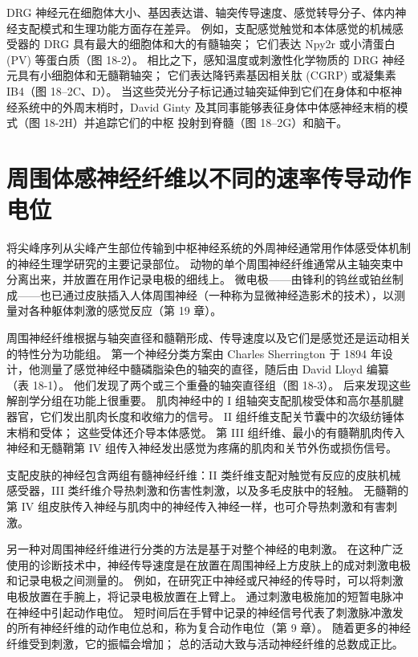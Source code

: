 DRG 神经元在细胞体大小、基因表达谱、轴突传导速度、感觉转导分子、体内神经支配模式和生理功能方面存在差异。 例如，支配感觉触觉和本体感觉的机械感受器的 DRG 具有最大的细胞体和大的有髓轴突； 它们表达 Npy2r 或小清蛋白 (PV) 等蛋白质（图 18-2）。 相比之下，感知温度或刺激性化学物质的 DRG 神经元具有小细胞体和无髓鞘轴突； 它们表达降钙素基因相关肽 (CGRP) 或凝集素 IB4（图 18–2C、D）。 当这些荧光分子标记通过轴突延伸到它们在身体和中枢神经系统中的外周末梢时，David Ginty 及其同事能够表征身体中体感神经末梢的模式（图 18-2H）并追踪它们的中枢 投射到脊髓（图 18–2G）和脑干。

\section{周围体感神经纤维以不同的速率传导动作电位}

将尖峰序列从尖峰产生部位传输到中枢神经系统的外周神经通常用作体感受体机制的神经生理学研究的主要记录部位。 动物的单个周围神经纤维通常从主轴突束中分离出来，并放置在用作记录电极的细线上。 微电极——由锋利的钨丝或铂丝制成——也已通过皮肤插入人体周围神经（一种称为显微神经造影术的技术），以测量对各种躯体刺激的感觉反应（第 19 章）。

周围神经纤维根据与轴突直径和髓鞘形成、传导速度以及它们是感觉还是运动相关的特性分为功能组。 第一个神经分类方案由 Charles Sherrington 于 1894 年设计，他测量了感觉神经中髓磷脂染色的轴突的直径，随后由 David Lloyd 编纂（表 18-1）。 他们发现了两个或三个重叠的轴突直径组（图 18-3）。 后来发现这些解剖学分组在功能上很重要。 肌肉神经中的 I 组轴突支配肌梭受体和高尔基肌腱器官，它们发出肌肉长度和收缩力的信号。 II 组纤维支配关节囊中的次级纺锤体末梢和受体； 这些受体还介导本体感觉。 第 III 组纤维、最小的有髓鞘肌肉传入神经和无髓鞘第 IV 组传入神经发出感觉为疼痛的肌肉和关节外伤或损伤信号。

支配皮肤的神经包含两组有髓神经纤维：II 类纤维支配对触觉有反应的皮肤机械感受器，III 类纤维介导热刺激和伤害性刺激，以及多毛皮肤中的轻触。 无髓鞘的第 IV 组皮肤传入神经与肌肉中的神经传入神经一样，也可介导热刺激和有害刺激。

另一种对周围神经纤维进行分类的方法是基于对整个神经的电刺激。 在这种广泛使用的诊断技术中，神经传导速度是在放置在周围神经上方皮肤上的成对刺激电极和记录电极之间测量的。 例如，在研究正中神经或尺神经的传导时，可以将刺激电极放置在手腕上，将记录电极放置在上臂上。 通过刺激电极施加的短暂电脉冲在神经中引起动作电位。 短时间后在手臂中记录的神经信号代表了刺激脉冲激发的所有神经纤维的动作电位总和，称为复合动作电位（第 9 章）。 随着更多的神经纤维受到刺激，它的振幅会增加； 总的活动大致与活动神经纤维的总数成正比。

